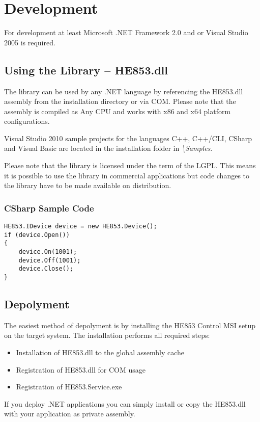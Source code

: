 \documentclass[
a4paper,
oneside,
halfparskip*,
normalheadings,
]
{scrbook}
\begin{document}
\chapter{Development}

For development at least Microsoft .NET Framework 2.0 and or Visual Studio 2005 is required.

\section{Using the Library -- HE853.dll}

The library can be used by any .NET language by referencing the HE853.dll assembly from the
installation directory or via COM. Please note that the assembly is compiled as Any CPU
and works with x86 and x64 platform configurations.

Visual Studio 2010 sample projects for the languages C++, C++/CLI, CSharp and Visual Basic
are located in the installation folder in \textit{\textbackslash Samples}.

Please note that the library is licensed under the term of the LGPL. This means it is
possible to use the library in commercial applications but code changes to the library
have to be made available on distribution.

\subsection{CSharp Sample Code}

\begin{verbatim}
HE853.IDevice device = new HE853.Device();
if (device.Open())
{
    device.On(1001);
    device.Off(1001);
    device.Close();
}
\end{verbatim}

\section{Depolyment}
The easiest method of depolyment is by installing the HE853 Control MSI setup on the target
system. The installation performs all required steps:

\begin{itemize}
  \item Installation of HE853.dll to the global assembly cache
	\item Registration of HE853.dll for COM usage
	\item Registration of HE853.Service.exe
\end{itemize}

If you deploy .NET applications you can simply install or copy the HE853.dll with your application
as private assembly.
\end{document}
